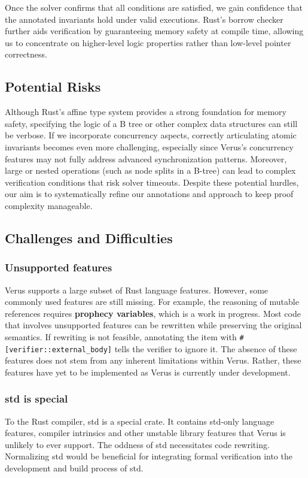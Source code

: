 \documentclass[conference]{IEEEtran}
\begin{document}
Once the solver confirms that all conditions are satisfied, we gain confidence that the annotated invariants hold under valid executions. Rust’s borrow checker further aids verification by guaranteeing memory safety at compile time, allowing us to concentrate on higher-level logic properties rather than low-level pointer correctness.

\subsection{Potential Risks}
Although Rust’s affine type system provides a strong foundation for memory safety, specifying the logic of a B tree or other complex data structures can still be verbose. If we incorporate concurrency aspects, correctly articulating atomic invariants becomes even more challenging, especially since Verus’s concurrency features may not fully address advanced synchronization patterns. Moreover, large or nested operations (such as node splits in a B-tree) can lead to complex verification conditions that risk solver timeouts. Despite these potential hurdles, our aim is to systematically refine our annotations and approach to keep proof complexity manageable.

\subsection{Challenges and Difficulties}
\subsubsection{Unsupported features} 
Verus supports a large subset of Rust language features. However, some commonly used features are still missing. For example, the reasoning of mutable references requires \textbf{prophecy variables}\cite{Prophecy}, which is a work in progress. Most code that involves unsupported features can be rewritten while preserving the original semantics. If rewriting is not feasible, annotating the item with \texttt{\#[verifier::external\_body]} tells the verifier to ignore it. The absence of these features does not stem from any inherent limitations within Verus. Rather, these features have yet to be implemented as Verus is currently under development.  

\subsubsection{std is special}
To the Rust compiler, std is a special crate. It contains std-only language features, compiler intrinsics and other unstable library features that Verus is unlikely to ever support. The oddness of std necessitates code rewriting. Normalizing std would be beneficial for integrating formal verification into the development and build process of std.     
\end{document}
